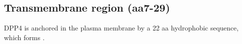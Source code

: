 \subsection{Transmembrane region (aa7-29)}

DPP4 is anchored in the plasma membrane by a 22 aa hydrophobic sequence, which forms  \alpha. \cite{Hong_1990}